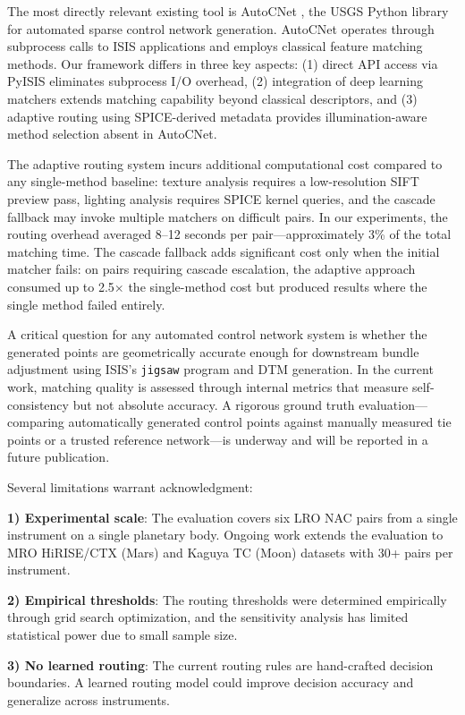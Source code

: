 \documentclass[lettersize,journal]{IEEEtran}
\newcommand{\pyisis}{PyISIS}
\begin{document}
The most directly relevant existing tool is AutoCNet \cite{laura2018autocnet}, the USGS Python library for automated sparse control network generation. AutoCNet operates through subprocess calls to ISIS applications and employs classical feature matching methods. Our framework differs in three key aspects: (1) direct API access via \pyisis{} eliminates subprocess I/O overhead, (2) integration of deep learning matchers extends matching capability beyond classical descriptors, and (3) adaptive routing using SPICE-derived metadata provides illumination-aware method selection absent in AutoCNet.

The adaptive routing system incurs additional computational cost compared to any single-method baseline: texture analysis requires a low-resolution SIFT preview pass, lighting analysis requires SPICE kernel queries, and the cascade fallback may invoke multiple matchers on difficult pairs. In our experiments, the routing overhead averaged 8--12 seconds per pair—approximately 3\% of the total matching time. The cascade fallback adds significant cost only when the initial matcher fails: on pairs requiring cascade escalation, the adaptive approach consumed up to 2.5$\times$ the single-method cost but produced results where the single method failed entirely.

A critical question for any automated control network system is whether the generated points are geometrically accurate enough for downstream bundle adjustment using ISIS's \texttt{jigsaw} program and DTM generation. In the current work, matching quality is assessed through internal metrics that measure self-consistency but not absolute accuracy. A rigorous ground truth evaluation—comparing automatically generated control points against manually measured tie points or a trusted reference network—is underway and will be reported in a future publication.

Several limitations warrant acknowledgment:

\textbf{1) Experimental scale}: The evaluation covers six LRO NAC pairs from a single instrument on a single planetary body. Ongoing work extends the evaluation to MRO HiRISE/CTX (Mars) and Kaguya TC (Moon) datasets with 30+ pairs per instrument.

\textbf{2) Empirical thresholds}: The routing thresholds were determined empirically through grid search optimization, and the sensitivity analysis has limited statistical power due to small sample size.

\textbf{3) No learned routing}: The current routing rules are hand-crafted decision boundaries. A learned routing model could improve decision accuracy and generalize across instruments.
\end{document}
